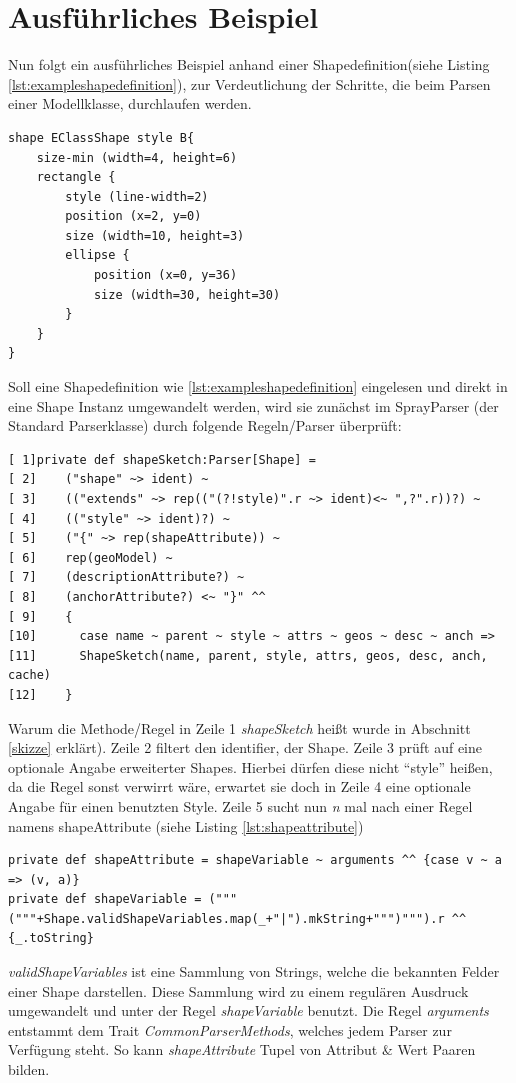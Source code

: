 \section{Ausführliches Beispiel}\label{example}
Nun folgt ein ausführliches Beispiel anhand einer Shapedefinition(siehe Listing \ref{lst:exampleshapedefinition}), zur Verdeutlichung der Schritte, die beim Parsen einer Modellklasse, durchlaufen werden.
\begin{lstlisting}[style=spray, caption = {Beispieldefinition für eine Shape}, label = {lst:exampleshapedefinition}]
shape EClassShape style B{
    size-min (width=4, height=6)
    rectangle {
        style (line-width=2)
        position (x=2, y=0)
        size (width=10, height=3)
        ellipse {
            position (x=0, y=36)
            size (width=30, height=30)
        }
    }
}
\end{lstlisting}Soll eine Shapedefinition wie \ref{lst:exampleshapedefinition} eingelesen und direkt in eine Shape Instanz umgewandelt werden, wird sie zunächst im SprayParser (der Standard Parserklasse) durch folgende Regeln/Parser überprüft:
\begin{lstlisting}[style=scala, caption = {Auszug aus Code Methode zum Parsen einer Shape(Sketch)}, label = {lst:defshapesketch}]
[ 1]private def shapeSketch:Parser[Shape] =
[ 2]    ("shape" ~> ident) ~
[ 3]    (("extends" ~> rep(("(?!style)".r ~> ident)<~ ",?".r))?) ~
[ 4]    (("style" ~> ident)?) ~
[ 5]    ("{" ~> rep(shapeAttribute)) ~
[ 6]    rep(geoModel) ~
[ 7]    (descriptionAttribute?) ~
[ 8]    (anchorAttribute?) <~ "}" ^^
[ 9]    {
[10]      case name ~ parent ~ style ~ attrs ~ geos ~ desc ~ anch =>
[11]      ShapeSketch(name, parent, style, attrs, geos, desc, anch, cache) 
[12]    }
\end{lstlisting}Warum die Methode/Regel in Zeile 1 \textit{shapeSketch} heißt wurde in Abschnitt \ref{skizze} erklärt). Zeile 2 filtert den identifier, der Shape. Zeile 3 prüft auf eine optionale Angabe erweiterter Shapes. Hierbei dürfen diese nicht "`style"' heißen, da die Regel sonst verwirrt wäre, erwartet sie doch in Zeile 4 eine optionale Angabe für einen benutzten Style. Zeile 5 sucht nun \textit{n} mal nach einer Regel namens shapeAttribute (siehe Listing \ref{lst:shapeattribute})
\begin{lstlisting}[style=scala, caption = {Auszug aus Code Regeln zum Parsen der Felder}, label = {lst:shapeattribute}]
private def shapeAttribute = shapeVariable ~ arguments ^^ {case v ~ a => (v, a)}
private def shapeVariable = ("""("""+Shape.validShapeVariables.map(_+"|").mkString+""")""").r ^^ {_.toString}
\end{lstlisting}\textit{validShapeVariables} ist eine Sammlung von Strings, welche die bekannten Felder einer Shape darstellen. Diese Sammlung wird zu einem regulären Ausdruck umgewandelt und unter der Regel \textit{shapeVariable} benutzt. Die Regel \textit{arguments} entstammt dem Trait \textit{CommonParserMethods}, welches jedem Parser zur Verfügung steht. So kann \textit{shapeAttribute} Tupel von Attribut \& Wert Paaren bilden. 
